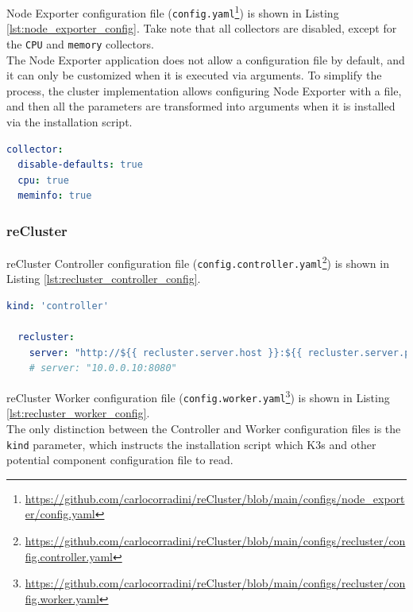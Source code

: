 Node Exporter configuration file (\texttt{config.yaml}\footnote{\url{https://github.com/carlocorradini/reCluster/blob/main/configs/node_exporter/config.yaml}})
is shown in Listing \ref{lst:node_exporter_config}. Take note that all
collectors are disabled, except for the \texttt{CPU} and \texttt{memory} collectors.
\\ %
The Node Exporter application does not allow a configuration file by default,
and it can only be customized when it is executed via arguments. To simplify the
process, the cluster implementation allows configuring Node Exporter with a file,
and then all the parameters are transformed into arguments when it is installed via
the installation script.

\begin{lstlisting}[language=yaml, alsoletter={.-}, morekeywords={[2]{collector, disable-defaults, cpu, meminfo}}, xleftmargin=\parindent, label={lst:node_exporter_config}, caption=Node Exporter configuration file]
collector:
  disable-defaults: true
  cpu: true
  meminfo: true
\end{lstlisting}

\subsubsection{reCluster}
\label{subsubsec:implementation_installer_configuration_files_recluster}

reCluster Controller configuration file (\texttt{config.controller.yaml}\footnote{\url{https://github.com/carlocorradini/reCluster/blob/main/configs/recluster/config.controller.yaml}})
is shown in Listing \ref{lst:recluster_controller_config}.

\begin{lstlisting}[language=yaml, alsoletter={.}, morekeywords={[2]{kind, recluster, server}}, xleftmargin=\parindent, label={lst:recluster_controller_config}, caption=reCluster Controller configuration file]
  kind: 'controller'

  recluster:
    server: "http://${{ recluster.server.host }}:${{ recluster.server.port }}"
    # server: "10.0.0.10:8080"
\end{lstlisting}

reCluster Worker configuration file (\texttt{config.worker.yaml}\footnote{\url{https://github.com/carlocorradini/reCluster/blob/main/configs/recluster/config.worker.yaml}})
is shown in Listing \ref{lst:recluster_worker_config}. \\ %
The only distinction between the Controller and Worker configuration files is
the \texttt{kind} parameter, which instructs the installation script which K3s
and other potential component configuration file to read.


